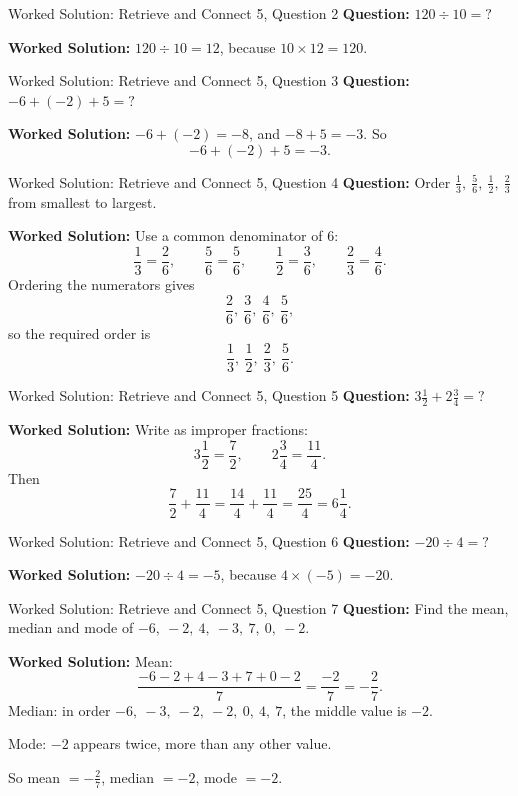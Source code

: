 \documentclass{beamer}
\begin{document}
\begin{frame}{Worked Solution: Retrieve and Connect 5, Question 2}
\small
\textbf{Question:} \(120 \div 10=\mathord{?}\)

\smallskip
\textbf{Worked Solution:} \(120 \div 10 = 12\), because \(10 \times 12 = 120\).
\end{frame}

\begin{frame}{Worked Solution: Retrieve and Connect 5, Question 3}
\small
\textbf{Question:} \(-6+(-2)+5=\mathord{?}\)

\smallskip
\textbf{Worked Solution:} \(-6+(-2)=-8\), and \(-8+5=-3\). So
\[
-6+(-2)+5=-3.
\]
\end{frame}

\begin{frame}{Worked Solution: Retrieve and Connect 5, Question 4}
\small
\textbf{Question:} Order \(\frac13,\ \frac56,\ \frac12,\ \frac23\) from smallest to largest.

\smallskip
\textbf{Worked Solution:} Use a common denominator of \(6\):
\[
\frac13=\frac26,\qquad \frac56=\frac56,\qquad \frac12=\frac36,\qquad \frac23=\frac46.
\]
Ordering the numerators gives
\[
\frac26,\ \frac36,\ \frac46,\ \frac56,
\]
so the required order is
\[
\frac13,\ \frac12,\ \frac23,\ \frac56.
\]
\end{frame}

\begin{frame}{Worked Solution: Retrieve and Connect 5, Question 5}
\small
\textbf{Question:} \(3\frac12+2\frac34=\mathord{?}\)

\smallskip
\textbf{Worked Solution:} Write as improper fractions:
\[
3\frac12=\frac72,\qquad 2\frac34=\frac{11}{4}.
\]
Then
\[
\frac72+\frac{11}{4}=\frac{14}{4}+\frac{11}{4}=\frac{25}{4}=6\frac14.
\]
\end{frame}

\begin{frame}{Worked Solution: Retrieve and Connect 5, Question 6}
\small
\textbf{Question:} \(-20 \div 4=\mathord{?}\)

\smallskip
\textbf{Worked Solution:} \(-20 \div 4 = -5\), because \(4 \times (-5)=-20\).
\end{frame}

\begin{frame}{Worked Solution: Retrieve and Connect 5, Question 7}
\small
\textbf{Question:} Find the mean, median and mode of \(-6,\ -2,\ 4,\ -3,\ 7,\ 0,\ -2\).

\smallskip
\textbf{Worked Solution:} Mean:
\[
\frac{-6-2+4-3+7+0-2}{7}=\frac{-2}{7}=-\frac27.
\]
Median: in order \(-6,\ -3,\ -2,\ -2,\ 0,\ 4,\ 7\), the middle value is \(-2\).

Mode: \(-2\) appears twice, more than any other value.

So mean \(=-\frac27\), median \(=-2\), mode \(=-2\).
\end{frame}
\end{document}
